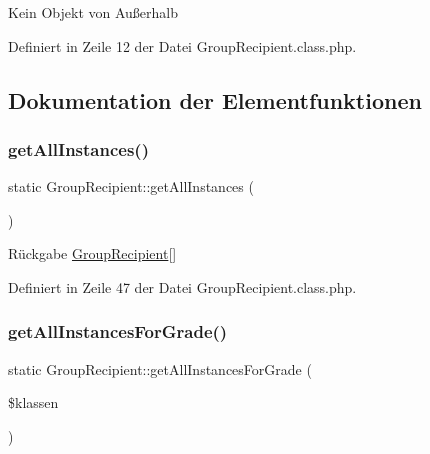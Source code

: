 Kein Objekt von Außerhalb 

Definiert in Zeile 12 der Datei Group\+Recipient.\+class.\+php.



\subsection{Dokumentation der Elementfunktionen}
\mbox{\label{class_group_recipient_a704918a8e4563a6072c968ba2cadbfcc}} 
\subsubsection{\texorpdfstring{get\+All\+Instances()}{getAllInstances()}}
{\footnotesize\ttfamily static Group\+Recipient\+::get\+All\+Instances (\begin{DoxyParamCaption}{ }\end{DoxyParamCaption})\hspace{0.3cm}{\ttfamily [static]}}

\begin{DoxyReturn}{Rückgabe}
\mbox{\hyperlink{class_group_recipient}{Group\+Recipient}}\mbox{[}\mbox{]} 
\end{DoxyReturn}


Definiert in Zeile 47 der Datei Group\+Recipient.\+class.\+php.

\mbox{\label{class_group_recipient_a08b8e01254655e2014cded1dbe909a4c}} 
\subsubsection{\texorpdfstring{get\+All\+Instances\+For\+Grade()}{getAllInstancesForGrade()}}
{\footnotesize\ttfamily static Group\+Recipient\+::get\+All\+Instances\+For\+Grade (\begin{DoxyParamCaption}\item[{}]{\$klassen }\end{DoxyParamCaption})\hspace{0.3cm}{\ttfamily [static]}}


